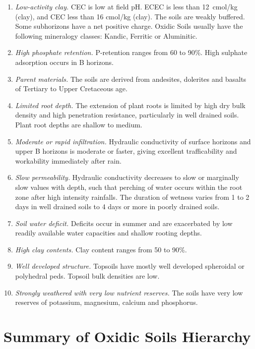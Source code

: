 \documentclass[
  letterpaper,
  DIV=11,
  numbers=noendperiod]{scrreprt}
\providecommand{\tightlist}{%
  \setlength{\itemsep}{0pt}\setlength{\parskip}{0pt}}\usepackage{longtable,booktabs,array}
\begin{document}
\begin{enumerate}
\def\labelenumi{\arabic{enumi}.}
\tightlist
\item
  \emph{Low-activity clay.} CEC is low at field pH. ECEC is less than
  12~cmol/kg (clay), and CEC less than 16 cmol/kg (clay). The soils are
  weakly buffered. Some subhorizons have a net positive charge. Oxidic
  Soils usually have the following mineralogy classes: Kandic, Ferritic
  or Aluminitic.
\item
  \emph{High phosphate retention.} P-retention ranges from 60 to 90\%.
  High sulphate adsorption occurs in B horizons.
\item
  \emph{Parent materials.} The soils are derived from andesites,
  dolerites and basalts of Tertiary to Upper Cretaceous age.
\item
  \emph{Limited root depth.} The extension of plant roots is limited by
  high dry bulk density and high penetration resistance, particularly in
  well drained soils. Plant root depths are shallow to medium.
\item
  \emph{Moderate or rapid infiltration.} Hydraulic conductivity of
  surface horizons and upper B horizons is moderate or faster, giving
  excellent trafficability and workability immediately after rain.
\item
  \emph{Slow permeability.} Hydraulic conductivity decreases to slow or
  marginally slow values with depth, such that perching of water occurs
  within the root zone after high intensity rainfalls. The duration of
  wetness varies from 1 to 2 days in well drained soils to 4 days or
  more in poorly drained soils.
\item
  \emph{Soil water deficit.} Deficits occur in summer and are
  exacerbated by low readily available water capacities and shallow
  rooting depths.
\item
  \emph{High clay contents.} Clay content ranges from 50 to 90\%.
\item
  \emph{Well developed structure.} Topsoils have mostly well developed
  spheroidal or polyhedral peds. Topsoil bulk densities are low.
\item
  \emph{Strongly weathered with very low nutrient reserves.} The soils
  have very low reserves of potassium, magnesium, calcium and
  phosphorus.
\end{enumerate}

\hypertarget{sec-sum-X}{%
\section{Summary of Oxidic Soils Hierarchy}\label{sec-sum-X}}
\end{document}
